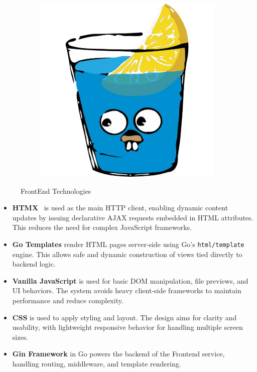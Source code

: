 \begin{figure}[h!]
\begin{subfigure}[b]{0.15\textwidth}
    \includegraphics[width=\textwidth]{Images/goGin_Logo.png}
    \label{fig:gogin}
  \end{subfigure}

  \caption{FrontEnd Technologies}
  \label{fig:authservices}
\end{figure}



\begin{itemize}
    \item \textbf{HTMX}~\cite{htmx-docs} is used as the main HTTP client, enabling dynamic content updates by issuing declarative AJAX requests embedded in HTML attributes. This reduces the need for complex JavaScript frameworks.
    
    \item \textbf{Go Templates} render HTML pages server-side using Go’s \texttt{html/template} engine. This allows safe and dynamic construction of views tied directly to backend logic.
    
    \item \textbf{Vanilla JavaScript} is used for basic DOM manipulation, file previews, and UI behaviors. The system avoids heavy client-side frameworks to maintain performance and reduce complexity.
    
    \item \textbf{CSS} is used to apply styling and layout. The design aims for clarity and usability, with lightweight responsive behavior for handling multiple screen sizes.
    
    \item \textbf{Gin Framework} in Go powers the backend of the Frontend service, handling routing, middleware, and template rendering.
\end{itemize}

